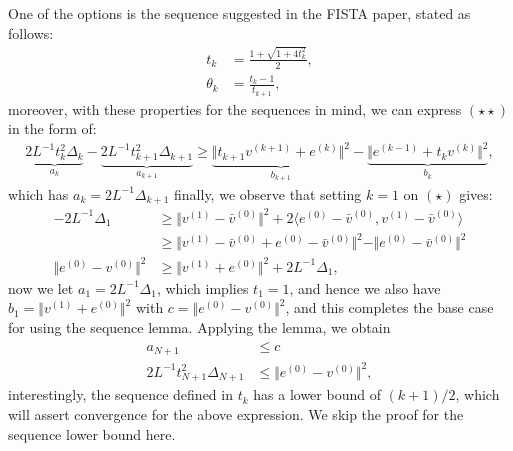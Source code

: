 \documentclass[]{article}
\theoremstyle{definition}
\begin{document}
        One of the options is the sequence suggested in the FISTA paper, stated as follows: 
        \begin{align*}
            t_k &= \frac{1 + \sqrt{1 + 4t_k^2}}{2}, 
            \\
            \theta_k &= \frac{t_k - 1}{t_{k + 1}}, 
            \tag{$\star \star *$}
        \end{align*}
        moreover, with these properties for the sequences in mind, we can express $(\star\star)$ in the form of:
        \begin{align*}
            \underbrace{2L^{-1}t_k^2\Delta_k}_{a_k} - \underbrace{2L^{-1}t_{k + 1}^2\Delta_{k + 1}}_{a_{k + 1}}
            \ge 
            \underbrace{\Vert t_{k + 1}v^{(k + 1)} + e^{(k)}\Vert^2}_{b_{k + 1}}
            - 
            \underbrace{\Vert e^{(k - 1)} + t_k  v^{(k)} \Vert^2}_{b_{k}}, 
        \end{align*}
        which has $a_k = 2L^{-1}\Delta_{k + 1}$ finally, we observe that setting $k = 1$ on $(\star)$ gives: 
        \begin{align*}
            -2L^{-1}  \Delta_1
            & \ge 
            \Vert v^{(1)} - \bar v^{(0)}\Vert^2 + 
            2\langle e^{(0)} - \bar v^{(0)}, v^{(1)} - \bar v^{(0)}\rangle
            \\
            &\ge
            \Vert 
                v^{(1)} - \bar v^{(0)}
                + 
                e^{(0)} - \bar v^{(0)}
            \Vert^2
            - 
            \Vert 
                e^{(0)} - \bar v^{(0)}
            \Vert^2
            \\
            \Vert e^{(0)} - v^{(0)}\Vert^2
            & \ge 
            \Vert v^{(1)} + e^{(0)}\Vert^2 + 2L^{-1}\Delta_1, 
        \end{align*}
        now we let $a_1 = 2L^{-1}\Delta_1$, which implies $t_1 = 1$, and hence we also have $b_1 = \Vert v^{(1)} + e^{(0)}\Vert^2$ with $c = \Vert e^{(0)} - v^{(0)}\Vert^2$, and this completes the base case for using the sequence lemma. Applying the lemma, we obtain 
        \begin{align*}
            a_{N + 1} &\le c
            \\
            2L^{-1}t_{N + 1}^2\Delta_{N + 1} &\le \Vert e^{(0)} - v^{(0)}\Vert^2, 
        \end{align*}
        interestingly, the sequence defined in $t_k$ has a lower bound of $(k + 1)/2$, which will assert convergence for the above expression. We skip the proof for the sequence lower bound here. 



\end{document}
